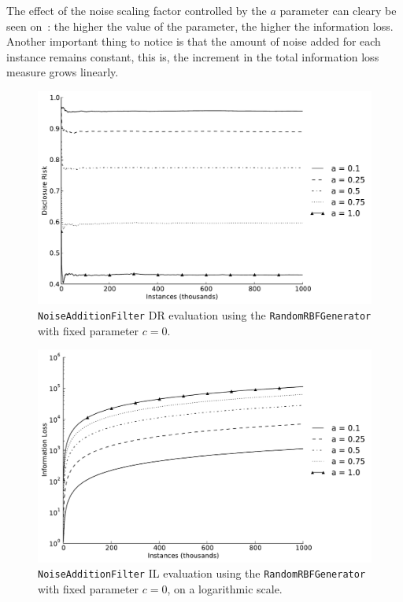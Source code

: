 The effect of the noise scaling factor controlled by the $a$ parameter can cleary be seen on~: the higher the value of the parameter, the higher the information loss. Another important thing to notice is that the amount of noise added for each instance remains constant, this is, the increment in the total information loss measure grows linearly.

\begin{figure}[h]
	\centering
	\includegraphics[width=0.9\linewidth]{figures/dr_na-random.pdf}
	\caption[Noise addition DR evaluation ($c = 0$).]{\texttt{NoiseAdditionFilter} DR evaluation using the \texttt{RandomRBFGenerator} with fixed parameter $c = 0$.}
	\label{fig:results-dr-na}
\end{figure}

\begin{figure}[h]
	\centering
	\includegraphics[width=0.9\linewidth]{figures/il-log_na-random.pdf}
	\caption[Noise addition IL evaluation ($c = 0$), logarithmic scale.]{\texttt{NoiseAdditionFilter} IL evaluation using the \texttt{RandomRBFGenerator} with fixed parameter $c = 0$, on a logarithmic scale.}
	\label{fig:results-il-log-na}
\end{figure}

